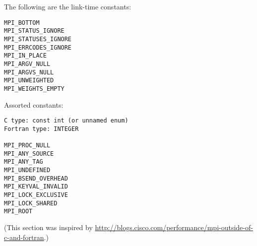 The following are the link-time constants:
\begin{lstlisting}
MPI_BOTTOM
MPI_STATUS_IGNORE
MPI_STATUSES_IGNORE
MPI_ERRCODES_IGNORE
MPI_IN_PLACE
MPI_ARGV_NULL
MPI_ARGVS_NULL
MPI_UNWEIGHTED
MPI_WEIGHTS_EMPTY
\end{lstlisting}

Assorted constants:
\begin{lstlisting}
C type: const int (or unnamed enum)
Fortran type: INTEGER

MPI_PROC_NULL
MPI_ANY_SOURCE
MPI_ANY_TAG
MPI_UNDEFINED
MPI_BSEND_OVERHEAD
MPI_KEYVAL_INVALID                
MPI_LOCK_EXCLUSIVE
MPI_LOCK_SHARED
MPI_ROOT
\end{lstlisting}

(This section was inspired by
\url{http://blogs.cisco.com/performance/mpi-outside-of-c-and-fortran}.)


